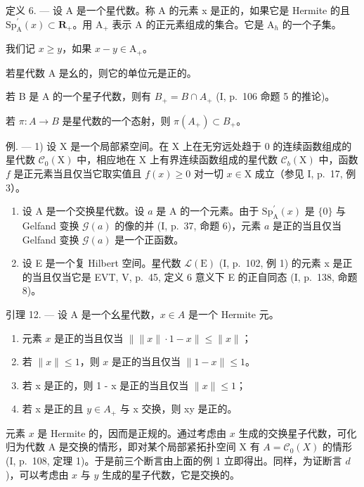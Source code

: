 定义 6. --- 设 A 是一个星代数。称 A 的元素 x 是正的，如果它是 Hermite 的且 \(\mathrm{Sp}_{\mathrm{A}}^{\prime}(x) \subset \mathbf{R}_{+}\)。用 \(\mathrm{A}_{+}\) 表示 A 的正元素组成的集合。它是 \(\mathrm{A}_{h}\) 的一个子集。

我们记 \(x \geqslant y\)，如果 \(x - y \in \mathrm{A}_{+}\)。

若星代数 A 是幺的，则它的单位元是正的。

若 B 是 A 的一个星子代数，则有 \(B_{+} = B \cap A_{+}\) (I, p.~106 命题 5 的推论)。

若 \(\pi\colon A\to B\) 是星代数的一个态射，则 \(\pi(A_{+})\subset B_{+}\)。

例. --- 1) 设 X 是一个局部紧空间。在 X 上在无穷远处趋于 0 的连续函数组成的星代数 \(\mathcal{C}_{0}(\mathrm{X})\) 中，相应地在 X 上有界连续函数组成的星代数 \(\mathcal{C}_{b}(\mathrm{X})\) 中，函数 \(f\) 是正元素当且仅当它取实值且 \(f(x) \geqslant 0\) 对一切 \(x \in \mathrm{X}\) 成立（参见 I, p.~17, 例 3）。

\begin{enumerate}
\def\labelenumi{\arabic{enumi})}
\setcounter{enumi}{1}
\item
  设 A 是一个交换星代数。设 \(a\) 是 A 的一个元素。由于 \(\mathrm{Sp}_{\mathrm{A}}^{\prime}(x)\) 是 \(\{0\}\) 与 Gelfand 变换 \(\mathcal{G}(a)\) 的像的并 (I, p.~37, 命题 6)，元素 \(a\) 是正的当且仅当 Gelfand 变换 \(\mathcal{G}(a)\) 是一个正函数。
\item
  设 E 是一个复 Hilbert 空间。星代数 \(\mathcal{L}(\mathrm{E})\) (I, p.~102, 例 1) 的元素 x 是正的当且仅当它是 EVT, V, p.~45, 定义 6 意义下 E 的正自同态 (I, p.~138, 命题 8)。
\end{enumerate}

引理 12. --- 设 A 是一个幺星代数，\(x \in A\) 是一个 Hermite 元。

\begin{enumerate}
\def\labelenumi{\alph{enumi})}
\item
  元素 \(x\) 是正的当且仅当 \(\left\| \|x\| \cdot 1 - x \right\| \leqslant \|x\|\)；
\item
  若 \(\| x\| \leqslant 1\)，则 \(x\) 是正的当且仅当 \(\| 1 - x\| \leqslant 1\)。
\item
  若 x 是正的，则 1 - x 是正的当且仅当 \(\|x\| \leqslant 1\)；
\item
  若 x 是正的且 \(y \in A_{+}\) 与 x 交换，则 xy 是正的。
\end{enumerate}

元素 \(x\) 是 Hermite 的，因而是正规的。通过考虑由 \(x\) 生成的交换星子代数，可化归为代数 A 是交换的情形，即对某个局部紧拓扑空间 X 有 \(A = \mathcal{C}_0(X)\) 的情形 (I, p.~108, 定理 1)。于是前三个断言由上面的例 1 立即得出。同样，为证断言 \(d\))，可以考虑由 \(x\) 与 \(y\) 生成的星子代数，它是交换的。

